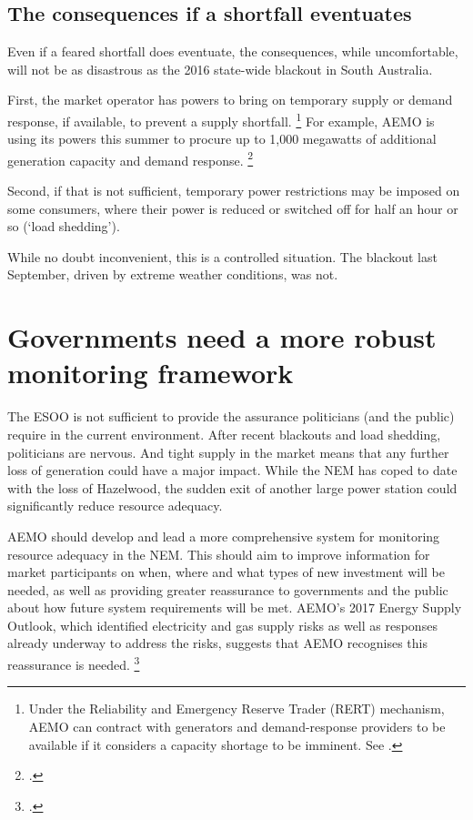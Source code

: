 \documentclass[FrontPage]{grattan}
\begin{document}
\subsection{The consequences if a shortfall eventuates}\label{subsec:consequences-if-a-shortfall-eventuates} 
Even if a feared shortfall does eventuate, the consequences, while uncomfortable, will not be as disastrous as the 2016 state-wide blackout in South Australia. 

First, the market operator has powers to bring on temporary supply or demand response, if available, to prevent a supply shortfall.%
\footnote{Under the Reliability and Emergency Reserve Trader (RERT) mechanism, AEMO can contract with generators and demand-response providers to be available if it considers a capacity shortage to be imminent. See \textcite{WoodBlowers-2017-Powering-Through}.} 
For example, AEMO is using its powers this summer to procure up to 1,000 megawatts of additional generation capacity and demand response.%
\footcite{AEMO2017AdviceDispatchableCapacity}

Second, if that is not sufficient, temporary power restrictions may be imposed on some consumers, where their power is reduced or switched off for half an hour or so (`load shedding').

While no doubt inconvenient, this is a controlled situation. The blackout last September, driven by extreme weather conditions, was not.

\section{Governments need a more robust monitoring framework}\label{sec:governments-need-a-more-robust-monitoring-framework}
The ESOO is not sufficient to provide the assurance politicians (and the public) require in the current environment. After recent blackouts and load shedding, politicians are nervous. And tight supply in the market means that any further loss of generation could have a major impact. While the NEM has coped to date with the loss of Hazelwood, the sudden exit of another large power station could significantly reduce resource adequacy. 

AEMO should develop and lead a more comprehensive system for monitoring resource adequacy in the NEM\@. This should aim to improve information for market participants on when, where and what types of new investment will be needed, as well as providing greater reassurance to governments and the public about how future system requirements will be met. AEMO's 2017 Energy Supply Outlook, which identified electricity and gas supply risks as well as responses already underway to address the risks, suggests that AEMO recognises this reassurance is needed.%
\footcite{AEMO2017ESO}
\end{document}
